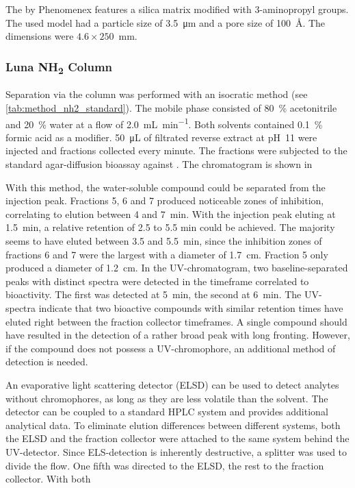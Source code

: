The \luna by Phenomenex features a silica matrix modified with 3-aminopropyl groups.
The used model had a particle size of \SI{3.5}{\micro\meter} and a pore size of 100~\AA.
The dimensions were $4.6\times250$~mm.

\subsubsection{Luna NH\textsubscript{2} Column}

Separation via the \luna column was performed with an isocratic method (see \ref{tab:method_nh2_standard}).
The mobile phase consisted of 80~\% acetonitrile and 20~\% water at a flow of \SI{2.0}{\milli\liter\per\minute}.
Both solvents contained 0.1~\% formic acid as a modifier.
\SI{50}{\micro\liter} of filtrated reverse extract at pH~11 were injected and fractions collected every minute.
The fractions were subjected to the standard agar-diffusion bioassay against \coli.
The chromatogram is shown in


With this method, the water-soluble compound could be separated from the injection peak.
Fractions 5, 6 and 7 produced noticeable zones of inhibition, correlating to elution between 4 and 7~min.
With the injection peak eluting at 1.5~min, a relative retention of 2.5 to 5.5 min could be achieved.
The majority seems to have eluted between 3.5 and 5.5~min, since the inhibition zones of fractions 6 and 7 were the largest with a diameter of \SI{1.7}{\centi\meter}.
Fraction 5 only produced a diameter of \SI{1.2}{\centi\meter}.
In the UV-chromatogram, two baseline-separated peaks with distinct spectra were detected in the timeframe correlated to bioactivity.
The first was detected at 5~min, the second at 6~min. The UV-spectra  indicate that two bioactive compounds with similar retention times have eluted right between the fraction collector timeframes.
A single compound should have resulted in the detection of a rather broad peak with long fronting.
However, if the compound does not possess a UV-chromophore, an additional method of detection is needed.

An evaporative light scattering detector (ELSD) can be used to detect analytes without chromophores, as long as they are less volatile than the solvent.\autocite{Mathews2004,Righezza1988,Mourey1984,Charlesworth1978}
The detector can be coupled to a standard HPLC system and provides additional analytical data.
To eliminate elution differences between different systems, both the ELSD and the fraction collector were attached to the same system behind the UV-detector.
Since ELS-detection is inherently destructive, a splitter was used to divide the flow. One fifth was directed to the ELSD, the rest to the fraction collector.
With both

